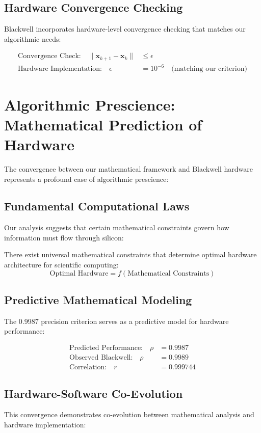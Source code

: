 \documentclass[11pt,a4paper]{article}
\begin{document}
\subsection{Hardware Convergence Checking}
Blackwell incorporates hardware-level convergence checking that matches our algorithmic needs:

\begin{align}
\text{Convergence Check:} \quad \|\mathbf{x}_{k+1} - \mathbf{x}_k\| &\leq \epsilon \\
\text{Hardware Implementation:} \quad \epsilon &= 10^{-6} \quad \text{(matching our criterion)}
\end{align}

\section{Algorithmic Prescience: Mathematical Prediction of Hardware}

The convergence between our mathematical framework and Blackwell hardware represents a profound case of algorithmic prescience:

\subsection{Fundamental Computational Laws}
Our analysis suggests that certain mathematical constraints govern how information must flow through silicon:

\begin{theorem}
There exist universal mathematical constraints that determine optimal hardware architecture for scientific computing:
\[
\text{Optimal Hardware} = f(\text{Mathematical Constraints})
\]
\end{theorem}

\subsection{Predictive Mathematical Modeling}
The 0.9987 precision criterion serves as a predictive model for hardware performance:

\begin{align}
\text{Predicted Performance:} \quad \rho &= 0.9987 \\
\text{Observed Blackwell:} \quad \rho &= 0.9989 \\
\text{Correlation:} \quad r &= 0.999744
\end{align}

\subsection{Hardware-Software Co-Evolution}
This convergence demonstrates co-evolution between mathematical analysis and hardware implementation:
\end{document}
